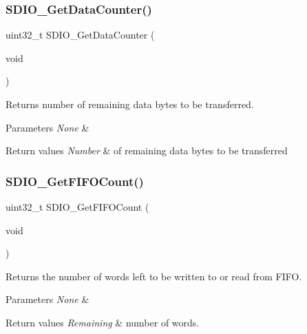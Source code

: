 \subsubsection{\texorpdfstring{SDIO\_GetDataCounter()}{SDIO\_GetDataCounter()}}
{\footnotesize\ttfamily uint32\+\_\+t S\+D\+I\+O\+\_\+\+Get\+Data\+Counter (\begin{DoxyParamCaption}\item[{void}]{ }\end{DoxyParamCaption})}



Returns number of remaining data bytes to be transferred. 


\begin{DoxyParams}{Parameters}
{\em None} & \\
\hline
\end{DoxyParams}

\begin{DoxyRetVals}{Return values}
{\em Number} & of remaining data bytes to be transferred \\
\hline
\end{DoxyRetVals}
\mbox{\label{group___s_d_i_o___private___functions_ga9a3343983a2d68b5164a1c89797d2dd6}} 
\subsubsection{\texorpdfstring{SDIO\_GetFIFOCount()}{SDIO\_GetFIFOCount()}}
{\footnotesize\ttfamily uint32\+\_\+t S\+D\+I\+O\+\_\+\+Get\+F\+I\+F\+O\+Count (\begin{DoxyParamCaption}\item[{void}]{ }\end{DoxyParamCaption})}



Returns the number of words left to be written to or read from F\+I\+FO. 


\begin{DoxyParams}{Parameters}
{\em None} & \\
\hline
\end{DoxyParams}

\begin{DoxyRetVals}{Return values}
{\em Remaining} & number of words. \\
\hline
\end{DoxyRetVals}
\mbox{\label{group___s_d_i_o___private___functions_ga644514b4b3c95c5c4326d99cd166f6f9}} 
